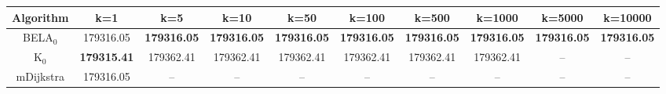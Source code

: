 \begin{tabular}{c|ccccccccc}\toprule
Algorithm & k=1 & k=5 & k=10 & k=50 & k=100 & k=500 & k=1000 & k=5000 & k=10000 \\ \midrule
BELA$_0$ & 179316.05 & \textbf{179316.05} & \textbf{179316.05} & \textbf{179316.05} & \textbf{179316.05} & \textbf{179316.05} & \textbf{179316.05} & \textbf{179316.05} & \textbf{179316.05} \\
K$_0$ & \textbf{179315.41} & 179362.41 & 179362.41 & 179362.41 & 179362.41 & 179362.41 & 179362.41 & -- & -- \\
mDijkstra & 179316.05 & -- & -- & -- & -- & -- & -- & -- & -- \\ \bottomrule 
\end{tabular}
